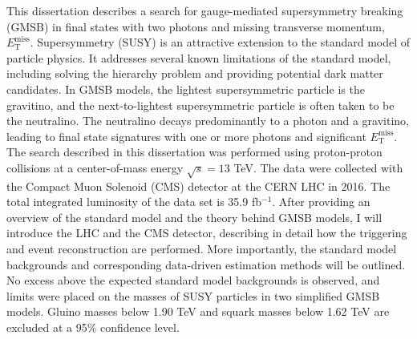 This dissertation describes a search for gauge-mediated supersymmetry breaking (GMSB) 
in final states with two photons and missing transverse momentum, $E_{\mathrm{T}}^{\text{miss}}$. 
Supersymmetry (SUSY) is an attractive extension to the standard model of particle physics. 
It addresses several known limitations of the standard model, 
including solving the hierarchy problem and providing potential dark matter candidates. 
In GMSB models, the lightest supersymmetric particle is the gravitino, and the next-to-lightest supersymmetric particle is often taken to be the neutralino. The neutralino decays predominantly to a photon and a gravitino, leading to final state signatures with one or more photons and significant $E_{\mathrm{T}}^{\text{miss}}$. 
The search described in this dissertation was performed using proton-proton collisions at a center-of-mass energy $\sqrt{s} = 13$ TeV. The data were collected with the Compact Muon Solenoid (CMS) detector at the CERN LHC in 2016. The total integrated luminosity of the data set is 35.9 fb$^{-1}$. 
After providing an overview of the standard model and the theory behind GMSB models, I will introduce the LHC and the CMS detector, describing in detail how the triggering and event reconstruction are performed.
More importantly, the standard model backgrounds and corresponding data-driven estimation methods will be outlined.
No excess above the expected standard model backgrounds is observed, and 
limits were placed on the masses of SUSY particles in two simplified GMSB models. 
Gluino masses below 1.90 TeV and squark masses below 1.62 TeV are excluded at a 95\% confidence level.
